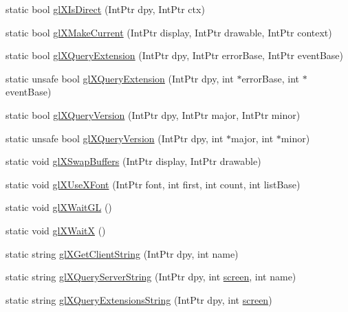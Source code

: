 \begin{DoxyCompactItemize}
\item 
static bool \hyperlink{class_tao_1_1_platform_1_1_x11_1_1_glx_ad048aba54f7eab58a584b1dcea688166}{glXIsDirect} (IntPtr dpy, IntPtr ctx)
\item 
static bool \hyperlink{class_tao_1_1_platform_1_1_x11_1_1_glx_aac8abadf42dd4d47edc8fc00e286a06c}{glXMakeCurrent} (IntPtr display, IntPtr drawable, IntPtr context)
\item 
static bool \hyperlink{class_tao_1_1_platform_1_1_x11_1_1_glx_a5f3b0189ebcda5badb7172dd832ba1cd}{glXQueryExtension} (IntPtr dpy, IntPtr errorBase, IntPtr eventBase)
\item 
static unsafe bool \hyperlink{class_tao_1_1_platform_1_1_x11_1_1_glx_ab218343c5a769c9b9d8ed92770af2f89}{glXQueryExtension} (IntPtr dpy, int $\ast$errorBase, int $\ast$eventBase)
\item 
static bool \hyperlink{class_tao_1_1_platform_1_1_x11_1_1_glx_a5d314de192c640752c8902453d5edb9f}{glXQueryVersion} (IntPtr dpy, IntPtr major, IntPtr minor)
\item 
static unsafe bool \hyperlink{class_tao_1_1_platform_1_1_x11_1_1_glx_ad4514586f97c9ecf1aba8f370942cef0}{glXQueryVersion} (IntPtr dpy, int $\ast$major, int $\ast$minor)
\item 
static void \hyperlink{class_tao_1_1_platform_1_1_x11_1_1_glx_a8813c95f25acc9a880a3189e50b73595}{glXSwapBuffers} (IntPtr display, IntPtr drawable)
\item 
static void \hyperlink{class_tao_1_1_platform_1_1_x11_1_1_glx_a1851177ab07d3055a646959d4a26bde2}{glXUseXFont} (IntPtr font, int first, int count, int listBase)
\item 
static void \hyperlink{class_tao_1_1_platform_1_1_x11_1_1_glx_af011969364e383e4fc44fcd6dbe0f324}{glXWaitGL} ()
\item 
static void \hyperlink{class_tao_1_1_platform_1_1_x11_1_1_glx_a6846e09cc30e96bce8b578189a0e9f53}{glXWaitX} ()
\item 
static string \hyperlink{class_tao_1_1_platform_1_1_x11_1_1_glx_aeec9d8d402521cfe898d869684d165a9}{glXGetClientString} (IntPtr dpy, int name)
\item 
static string \hyperlink{class_tao_1_1_platform_1_1_x11_1_1_glx_aa0544c28d81c9c5d721f2e5793a84fbc}{glXQueryServerString} (IntPtr dpy, int \hyperlink{_sdl_8cs_a968bba55c7ad32b326939fefd1bbb017}{screen}, int name)
\item 
static string \hyperlink{class_tao_1_1_platform_1_1_x11_1_1_glx_ad8eee6410dde2ad7ecf4b91e08b9acf5}{glXQueryExtensionsString} (IntPtr dpy, int \hyperlink{_sdl_8cs_a968bba55c7ad32b326939fefd1bbb017}{screen})

\end{DoxyCompactItemize}
